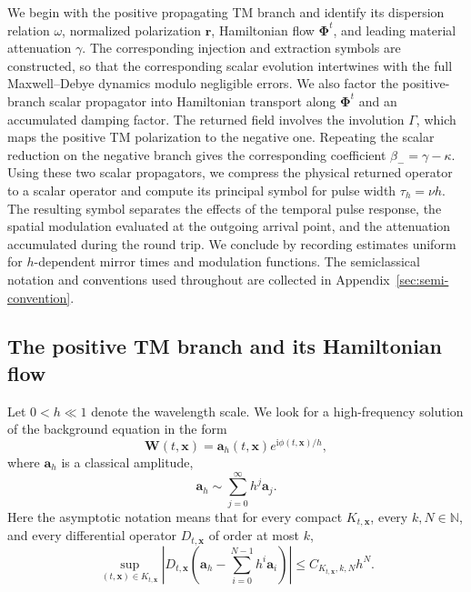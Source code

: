\documentclass[11pt,reqno]{amsart}
\newcommand{\ii}{\mathrm{i}}
\numberwithin{equation}{section}
\begin{document}
We begin with the positive propagating TM branch and identify its dispersion relation $\omega$, normalized polarization $\bm r$, Hamiltonian flow $\bm\Phi^t$, and leading material attenuation $\gamma$. The corresponding injection and extraction symbols are constructed, so that the corresponding scalar evolution intertwines with the full Maxwell--Debye dynamics modulo negligible errors. We also factor the positive-branch scalar propagator into Hamiltonian transport along $\bm\Phi^t$ and an accumulated damping factor. The returned field involves the involution $\Gamma$, which maps the positive TM polarization to the negative one. Repeating the scalar reduction on the negative branch gives the corresponding coefficient $\beta_-=\gamma-\kappa$. Using these two scalar propagators, we compress the physical returned operator to a scalar operator and compute its principal symbol for pulse width $\tau_h=\nu h$. The resulting symbol separates the effects of the temporal pulse response, the spatial modulation evaluated at the outgoing arrival point, and the attenuation accumulated during the round trip. We conclude by recording estimates uniform for $h$-dependent mirror times and modulation functions. The semiclassical notation and conventions used throughout are collected in Appendix~\ref{sec:semi-convention}.

\subsection{The positive TM branch and its Hamiltonian flow}

Let $0<h\ll1$ denote the wavelength scale. We look for a high-frequency solution of the background equation in the form
\begin{equation}\label{eq:wkb-ansatz}
    \bm W(t,\bm x)=\bm a_h(t,\bm x)e^{\ii\phi(t,\bm x)/h},
\end{equation}
where $\bm a_h$ is a classical amplitude,
\begin{equation*}
    \bm a_h\sim\sum_{j=0}^{\infty}h^j\bm a_j.
\end{equation*}
Here the asymptotic notation means that for every compact $K_{t,\bm x}$, every $k,N\in\mathbb N$, and every differential operator $D_{t,\bm x}$ of order at most $k$,
\begin{equation*}
 \sup_{(t,\bm x)\in K_{t,\bm x}}\left|D_{t,\bm x}\left(\bm a_h-\sum_{i=0}^{N-1}h^i\bm a_i\right)\right|\le C_{K_{t,\bm x},k,N}h^N.
\end{equation*}
\end{document}
